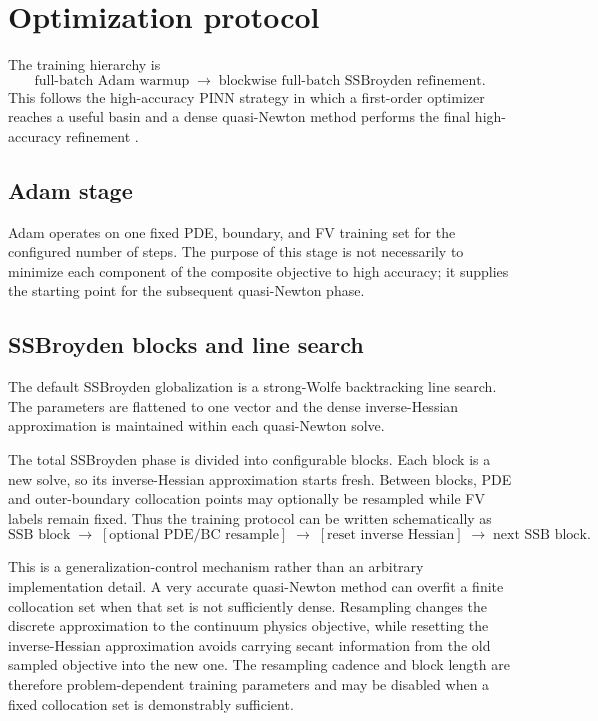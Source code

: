 \documentclass[11pt]{article}
\begin{document}
\section{Optimization protocol}
\label{sec:optimization}

The training hierarchy is
\begin{equation}
 \boxed{
 \text{full-batch Adam warmup}
 \;\longrightarrow\;
 \text{blockwise full-batch SSBroyden refinement}.
 }
\end{equation}
This follows the high-accuracy PINN strategy in which a first-order optimizer reaches a
useful basin and a dense quasi-Newton method performs the final high-accuracy refinement
\cite{Urban2025PINN}.

\subsection{Adam stage}

Adam operates on one fixed PDE, boundary, and FV training set for the configured number of
steps.  The purpose of this stage is not necessarily to minimize each component of the
composite objective to high accuracy; it supplies the starting point for the subsequent
quasi-Newton phase.

\subsection{SSBroyden blocks and line search}

The default SSBroyden globalization is a strong-Wolfe backtracking line search.  The
parameters are flattened to one vector and the dense inverse-Hessian approximation is
maintained within each quasi-Newton solve.

The total SSBroyden phase is divided into configurable blocks.  Each block is a new solve,
so its inverse-Hessian approximation starts fresh.  Between blocks, PDE and outer-boundary
collocation points may optionally be resampled while FV labels remain fixed.  Thus the
training protocol can be written schematically as
\begin{equation}
 \text{SSB block}
 \;\to\;
 \left[\text{optional PDE/BC resample}\right]
 \;\to\;
 \left[\text{reset inverse Hessian}\right]
 \;\to\;
 \text{next SSB block}.
\end{equation}

This is a generalization-control mechanism rather than an arbitrary implementation detail.
A very accurate quasi-Newton method can overfit a finite collocation set when that set is
not sufficiently dense.  Resampling changes the discrete approximation to the continuum
physics objective, while resetting the inverse-Hessian approximation avoids carrying
secant information from the old sampled objective into the new one.  The resampling
cadence and block length are therefore problem-dependent training parameters and may be
disabled when a fixed collocation set is demonstrably sufficient.
\end{document}
